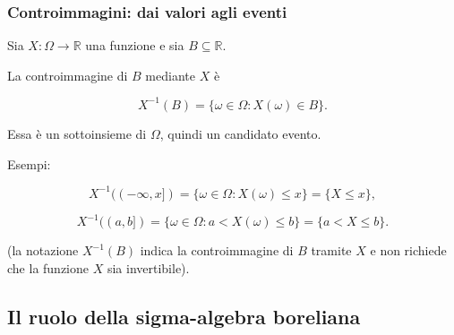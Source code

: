 \documentclass[handout]{beamer}%
\providecommand{\1}{\mathbf{1}}
\providecommand{\QTR}[2]{\csname #1\endcsname{#2}}
\begin{document}
\begin{frame}%
%

\frametitle{Controimmagini: dai valori agli eventi}%


Sia $X:\Omega\to\mathbb{R}$ una funzione e sia $B\subseteq\mathbb{R}$.

\medskip

La controimmagine di $B$ mediante $X$ \`{e}%

\[
X^{-1}(B)=\{\omega\in\Omega:X(\omega)\in B\}.
\]


\medskip

Essa \`{e} un sottoinsieme di $\Omega$, quindi un candidato evento.

\medskip

Esempi:%

\[
X^{-1}((-\infty,x]) = \{\omega\in\Omega:X(\omega)\leq x\} = \{X\leq x\},
\]
%

\[
X^{-1}((a,b]) = \{\omega\in\Omega:a<X(\omega)\leq b\} = \{a<X\leq b\}.
\]


\medskip



(la notazione $X^{-1}(B)$ indica la controimmagine di $B$ tramite $X$ e non
richiede che la funzione $X$ sia invertibile).%

\transboxout
\end{frame}%




\subsection{Il ruolo della sigma-algebra boreliana}%
\end{document}
